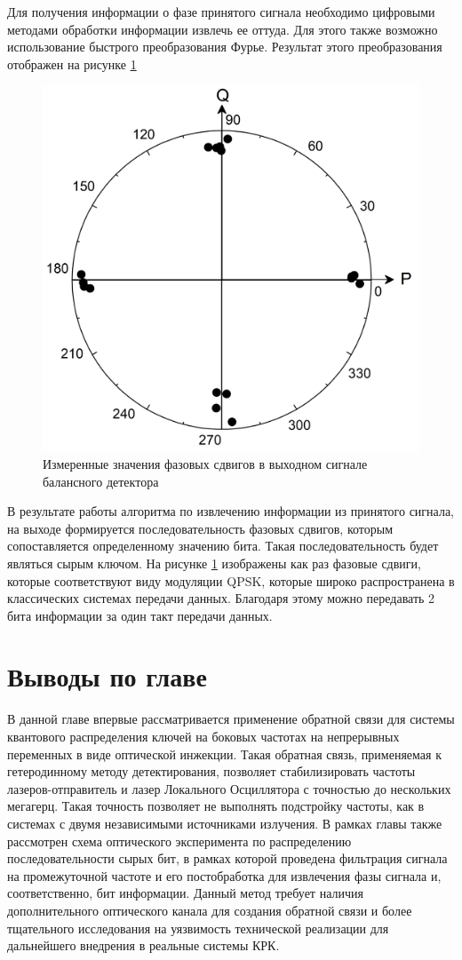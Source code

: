 Для получения информации о фазе принятого сигнала необходимо цифровыми методами обработки информации извлечь ее оттуда. Для этого также возможно использование быстрого преобразования Фурье. Результат этого преобразования отображен на рисунке \ref{fig:phase meas ch2} 
\begin{figure}
    \centering
    \includegraphics[width=0.6\linewidth]{images/06.png}
    \caption{Измеренные значения фазовых сдвигов в выходном сигнале балансного детектора}
    \label{fig:phase meas ch2}
\end{figure}
В результате работы алгоритма по извлечению информации из принятого сигнала, на выходе формируется последовательность фазовых сдвигов, которым сопоставляется определенному значению бита. Такая последовательность будет являться сырым ключом. На рисунке \ref{fig:phase meas ch2} изображены как раз фазовые сдвиги, которые соответствуют виду модуляции QPSK, которые широко распространена в классических системах передачи данных.
Благодаря этому можно передавать 2 бита информации за один такт передачи данных. 

\section{Выводы по главе}\label{sec:ch2/sect8}
В данной главе впервые рассматривается применение обратной связи для системы квантового распределения ключей на боковых частотах на непрерывных переменных в виде оптической инжекции. Такая обратная связь, применяемая к гетеродинному методу детектирования, позволяет стабилизировать частоты лазеров-отправитель и лазер Локального Осциллятора с точностью до нескольких мегагерц.
Такая точность позволяет не выполнять подстройку частоты, как в системах с двумя независимыми источниками излучения. В рамках главы также рассмотрен схема оптического эксперимента по распределению последовательности сырых бит, в рамках которой проведена фильтрация сигнала на промежуточной частоте и его постобработка для извлечения фазы сигнала и, соответственно, бит информации.
Данный метод требует наличия дополнительного оптического канала для создания обратной связи и более тщательного исследования на уязвимость технической реализации для дальнейшего внедрения в реальные системы КРК.

